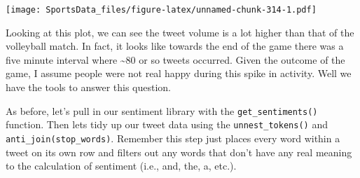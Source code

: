 \documentclass[]{book}
\newenvironment{Shaded}{\begin{snugshade}}{\end{snugshade}}
\newcommand{\DataTypeTok}[1]{\textcolor[rgb]{0.13,0.29,0.53}{#1}}
\newcommand{\KeywordTok}[1]{\textcolor[rgb]{0.13,0.29,0.53}{\textbf{#1}}}
\newcommand{\NormalTok}[1]{#1}
\newcommand{\OperatorTok}[1]{\textcolor[rgb]{0.81,0.36,0.00}{\textbf{#1}}}
\newcommand{\StringTok}[1]{\textcolor[rgb]{0.31,0.60,0.02}{#1}}
\begin{document}
\begin{Shaded}
\end{Shaded}

\texttt{[image: SportsData\_files/figure-latex/unnamed-chunk-314-1.pdf]}

Looking at this plot, we can see the tweet volume is a lot higher than that of the volleyball match. In fact, it looks like towards the end of the game there was a five minute interval where \textasciitilde{}80 or so tweets occurred. Given the outcome of the game, I assume people were not real happy during this spike in activity. Well we have the tools to answer this question.

As before, let's pull in our sentiment library with the \texttt{get\_sentiments()} function. Then lets tidy up our tweet data using the \texttt{unnest\_tokens()} and \texttt{anti\_join(stop\_words)}. Remember this step just places every word within a tweet on its own row and filters out any words that don't have any real meaning to the calculation of sentiment (i.e., and, the, a, etc.).

\begin{Shaded}
\end{Shaded}
\end{document}

